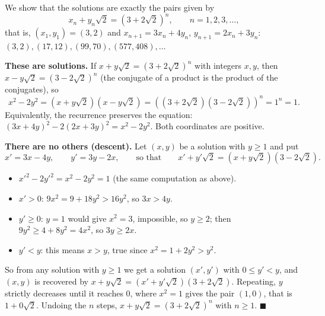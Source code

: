 We show that the solutions are exactly the pairs given by
\[
x_n+y_n\sqrt2=(3+2\sqrt2)^n,\qquad n=1,2,3,\dots,
\]
that is, $(x_1,y_1)=(3,2)$ and $x_{n+1}=3x_n+4y_n$, $y_{n+1}=2x_n+3y_n$: $(3,2),(17,12),(99,70),(577,408),\dots$

\textbf{These are solutions.} If $x+y\sqrt2=(3+2\sqrt2)^n$ with integers $x,y$, then $x-y\sqrt2=(3-2\sqrt2)^n$ (the conjugate of a product is the product of the conjugates), so
\[
x^2-2y^2=(x+y\sqrt2)(x-y\sqrt2)=\left((3+2\sqrt2)(3-2\sqrt2)\right)^n=1^n=1 .
\]
Equivalently, the recurrence preserves the equation: $(3x+4y)^2-2(2x+3y)^2=x^2-2y^2$. Both coordinates are positive.

\textbf{There are no others (descent).} Let $(x,y)$ be a solution with $y\ge1$ and put
\[
x'=3x-4y,\qquad y'=3y-2x,\qquad\text{so that}\qquad x'+y'\sqrt2=(x+y\sqrt2)(3-2\sqrt2).
\]
\begin{itemize}
\item $x'^2-2y'^2=x^2-2y^2=1$ (the same computation as above).
\item $x'>0$: $9x^2=9+18y^2>16y^2$, so $3x>4y$.
\item $y'\ge0$: $y=1$ would give $x^2=3$, impossible, so $y\ge2$; then $9y^2\ge4+8y^2=4x^2$, so $3y\ge2x$.
\item $y'<y$: this means $x>y$, true since $x^2=1+2y^2>y^2$.
\end{itemize}
So from any solution with $y\ge1$ we get a solution $(x',y')$ with $0\le y'<y$, and $(x,y)$ is recovered by $x+y\sqrt2=(x'+y'\sqrt2)(3+2\sqrt2)$. Repeating, $y$ strictly decreases until it reaches $0$, where $x^2=1$ gives the pair $(1,0)$, that is $1+0\sqrt2$. Undoing the $n$ steps, $x+y\sqrt2=(3+2\sqrt2)^n$ with $n\ge1$. $\blacksquare$
